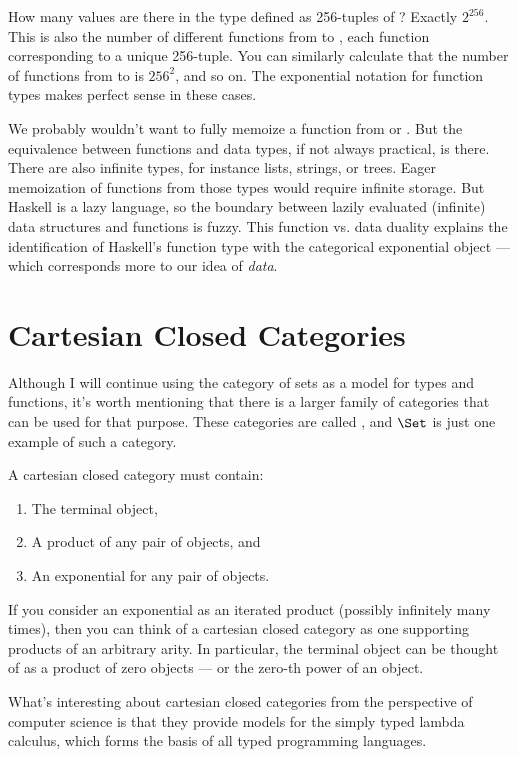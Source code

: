 How many values are there in the type defined as 256-tuples of
? Exactly $2^{256}$. This is also the number
of different functions from  to , each
function corresponding to a unique 256-tuple. You can similarly
calculate that the number of functions from  to
 is $256^{2}$, and so on. The exponential
notation for function types makes perfect sense in these cases.

We probably wouldn't want to fully memoize a function from 
or . But the equivalence between functions and data
types, if not always practical, is there. There are also infinite types,
for instance lists, strings, or trees. Eager memoization of functions
from those types would require infinite storage. But Haskell is a lazy
language, so the boundary between lazily evaluated (infinite) data
structures and functions is fuzzy. This function vs. data duality
explains the identification of Haskell's function type with the
categorical exponential object --- which corresponds more to our idea of
\emph{data}.

\section{Cartesian Closed Categories}

Although I will continue using the category of sets as a model for types
and functions, it's worth mentioning that there is a larger family of
categories that can be used for that purpose. These categories are
called , and $\Set$ is just one example of
such a category.

A cartesian closed category must contain:

\begin{enumerate}
\tightlist
\item
  The terminal object,
\item
  A product of any pair of objects, and
\item
  An exponential for any pair of objects.
\end{enumerate}
If you consider an exponential as an iterated product (possibly
infinitely many times), then you can think of a cartesian closed
category as one supporting products of an arbitrary arity. In
particular, the terminal object can be thought of as a product of zero
objects --- or the zero-th power of an object.

What's interesting about cartesian closed categories from the
perspective of computer science is that they provide models for the
simply typed lambda calculus, which forms the basis of all typed
programming languages.

